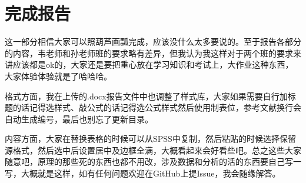 \documentclass[10pt, a4paper]{article}
\begin{document}
\section{完成报告}
这一部分相信大家可以照葫芦画瓢完成，应该没什么太多要说的。至于报告各部分的内容，韦老师和孙老师班的要求略有差异，但我认为我这样对于两个班的要求来讲应该都是ok的，大家还是要把重心放在学习知识和考试上，大作业这种东西，大家体验体验就是了哈哈哈。\par
格式方面，我在上传的.docx报告文件中也调整了样式库，大家如果需要自行加标题的话记得选样式、敲公式的话记得选公式样式然后使用制表位，参考文献换行会自动生成编号，最后也别忘了更新目录。\par
内容方面，大家在替换表格的时候可以从SPSS中复制，然后粘贴的时候选择保留源格式，然后选中后设置居中及边框全满，大概看起来会好看些吧。总之这些大家随意吧，原理的那些死的东西也都不用改，涉及数据和分析的活的东西要自己写一写，大概就是这样，如有任何问题欢迎在GitHub上提Issue，我会随缘解答。
\end{document}
